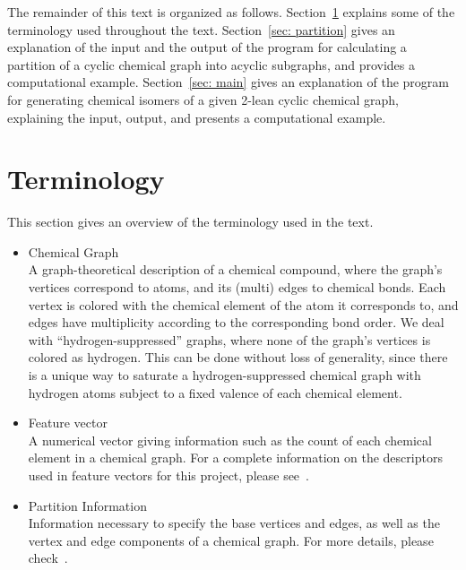 \documentclass[11pt,titlepage,dvipdfmx,twoside]{article}
\begin{document}
The remainder of this text is organized as follows.
Section~\ref{sec:term} explains some of the terminology used throughout the text.
Section~\ref{sec: partition} gives an explanation of the input and the output of
the program for calculating a partition of a cyclic chemical graph into
acyclic subgraphs, and provides a computational example.
Section~\ref{sec: main}
gives an explanation of the program for generating chemical isomers of
a given 2-lean cyclic chemical graph, explaining the input, output, and
presents a computational example.



\section{Terminology}
\label{sec:term}

This section gives an overview of the terminology used in the text.
%
\begin{itemize}
%
\item Chemical Graph\\
A graph-theoretical description of a chemical compound, 
where the graph's vertices correspond to atoms, and
its (multi) edges to chemical bonds.
Each vertex is colored with the chemical element of the atom it corresponds to,
and edges have multiplicity according to the corresponding bond order.
We deal with ``hydrogen-suppressed'' graphs, 
where none of the graph's vertices is colored as hydrogen.
This can be done without loss of generality,
since there is a unique way to saturate a hydrogen-suppressed chemical graph 
with hydrogen atoms subject to a fixed valence of each chemical element.


\item Feature vector\\
A numerical vector giving information such as the count of
each chemical element in a chemical graph.
For a complete information on the descriptors used in feature vectors for
this project, please see~\cite{branch}.



\item Partition Information\\
Information necessary to specify the base vertices and edges, as well as the vertex and edge components
of a chemical graph.
For more details, please check~\cite{branch}.



\end{itemize}
\end{document}

